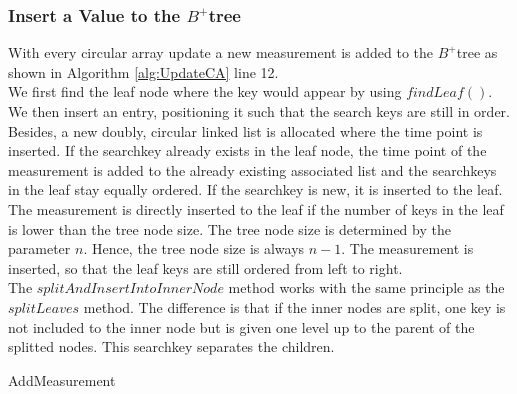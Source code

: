 \documentclass[abstracton,12pt]{scrreprt}
\begin{document}
\subsubsection{Insert a Value to the $B^+$tree}
With every circular array update a new measurement is added to the $B^+$tree as shown in Algorithm \ref{alg:UpdateCA} line 12.\\
We first find the leaf node where the key would
appear by using $findLeaf()$. We then insert an entry, positioning it such that the search keys are still in order. Besides, a new doubly, circular linked list is allocated where the time point is inserted. If the searchkey already exists in the leaf node, the time point of the measurement is added to the already existing associated list and the searchkeys in the leaf stay equally ordered. If the searchkey is new, it is inserted to the leaf. \\
The measurement is directly inserted to the leaf if the number of keys in the leaf is lower than the tree node size. The tree node size is determined by the parameter $n$. Hence, the tree node size is always $n-1$. The measurement is inserted, so that the leaf keys are still ordered from left to right. \\
The $splitAndInsertIntoInnerNode$ method works with the same principle as the $splitLeaves$ method. The difference is that if the inner nodes are split, one key is not included to the inner node but is given one level up to the parent of the splitted nodes. This searchkey separates the children. \\
\begin{algorithm}[H]
	\IncMargin{1em}
	\SetAlgoLined
	\DontPrintSemicolon
	
	
	

	\caption{AddMeasurement}	\label{AddMeasurement}
\end{algorithm}
\end{document}
